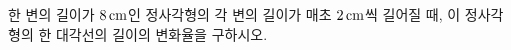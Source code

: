 한 변의 길이가 $8\mkern3mu \mathrm{cm}$인 정사각형의 각 변의 길이가 매초 $2\mkern3mu \mathrm{cm}$씩 길어질 때, 이 정사각형의 한 대각선의 길이의 변화율을 구하시오.
